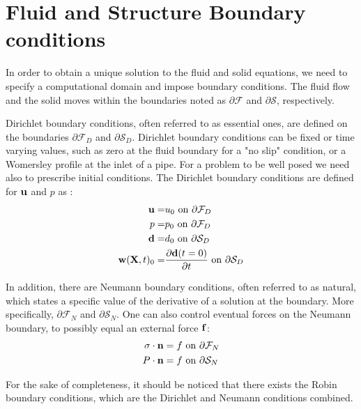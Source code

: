 \section{Fluid and Structure Boundary conditions}
In order to obtain a unique solution to the fluid and solid equations, we need to specify a computational domain and impose boundary conditions. The fluid flow and the solid moves within the boundaries noted as $ \partial\mathcal{F}$ and $ \partial \mathcal{S}$, respectively. 

Dirichlet boundary conditions, often referred to as essential ones, are defined on the boundaries $ \partial \mathcal{F}_D$ and $ \partial \mathcal{S}_D$.
Dirichlet boundary conditions can be fixed or time varying values, such as zero at the fluid boundary for a "no slip" condition, or a Womersley profile \cite{He1997} at the inlet of a pipe. For a problem to be well posed we need also to prescribe initial conditions.
The Dirichlet boundary conditions are defined for $\bold{u}$ and $p$ as :
\begin{align}
\bold{u} =& u_0 \text{   on   } \partial \mathcal{F}_D  \\
p =& p_0 \text{   on   } \partial \mathcal{F}_D  \\
\bold{d} =& d_0 \text{ on   } \partial \mathcal{S}_D  \\
\bold{w}(\textbf{X},t)_0 =& \frac{\partial \bold{d}(t=0)}{\partial t} \text{   on   } \partial \mathcal{S}_D   
\end{align}

In addition, there are Neumann boundary conditions, often referred to as natural, which states a specific value of the derivative of a solution at the boundary. More specifically, $\partial \mathcal{F}_N$ and $\partial \mathcal{S}_N$. One can also control eventual forces on the Neumann boundary, to possibly equal an external force $ \bold{f}$:
\begin{align}
\sigma \cdot \bold{n} &= f \text{   on   } \partial \mathcal{F}_N \\   
P\cdot \bold{n} &= f \text{   on   } \partial \mathcal{S}_N    
\end{align}

For the sake of completeness, it should be noticed that there exists the Robin boundary conditions, which are the Dirichlet and Neumann conditions combined.
